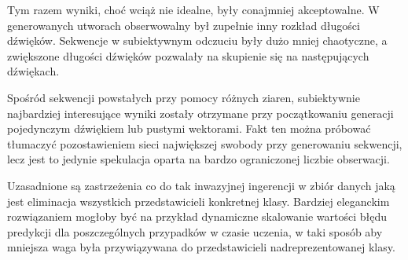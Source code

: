 {{        %

        Tym razem wyniki, choć wciąż nie idealne, były conajmniej akceptowalne. W generowanych utworach
        obserwowalny był zupełnie inny rozkład długości dźwięków. Sekwencje w subiektywnym odczuciu były dużo mniej
        chaotyczne, a zwiększone długości dźwięków pozwalały na skupienie się na następujących dźwiękach.
        
        Spośród sekwencji powstałych przy pomocy różnych ziaren, subiektywnie najbardziej interesujące wyniki
        zostały otrzymane przy początkowaniu generacji pojedynczym dźwiękiem lub pustymi wektorami.
        Fakt ten można próbować tłumaczyć pozostawieniem sieci największej swobody przy generowaniu sekwencji, lecz
        jest to jedynie spekulacja oparta na bardzo ograniczonej liczbie obserwacji.

        Uzasadnione są zastrzeżenia co do tak inwazyjnej ingerencji w zbiór danych jaką jest eliminacja 
        wszystkich przedstawicieli konkretnej klasy. Bardziej eleganckim rozwiązaniem mogłoby być na przykład
        dynamiczne skalowanie wartości błędu predykcji dla poszczególnych przypadków w czasie uczenia, w taki sposób
        aby mniejsza waga była przywiązywana do przedstawicieli nadreprezentowanej klasy.
    }
}